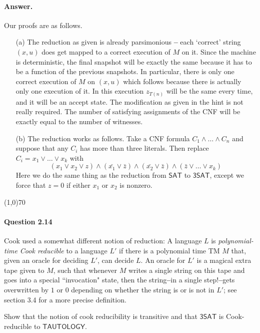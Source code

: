 \paragraph{Answer.} Our proofs are as follows.

\begin{enumerate}
	\item[(a)] The reduction as given is already parsimonious \textbf{--} each `correct' string $(x,u)$ does get mapped to a correct execution of $M$ on it. Since the machine is deterministic, the final snapshot will be exactly the same because it has to be a function of the previous snapshots. In particular, there is only one correct execution of $M$ on $(x,u)$ which follows because there is actually only one execution of it. In this execution $z_{T(n)}$ will be the same every time, and it will be an accept state. The modification as given in the hint is not really required. The number of satisfying assignments of the CNF will be exactly equal to the number of witnesses.
	\item[(b)] The reduction works as follows. Take a CNF formula $C_1\wedge \dots\wedge C_n$ and suppose that any $C_i$ has more than three literals. Then replace $C_i=x_1\vee\dots\vee x_k$ with
	$$(x_1\vee x_2\vee z)\wedge(\bar{x_1}\vee\bar{z})\wedge(\bar{x_2}\vee\bar{z})\wedge(\bar{z}\vee\dots\vee x_k)$$
	Here we do the same thing as the reduction from $\mathsf{SAT}$ to $\mathsf{3SAT}$, except we force that $z=0$ if either $x_1$ or $x_2$ is nonzero.
\end{enumerate}

\begin{center}
\line(1,0){70}
\end{center}

\paragraph{Question 2.14} Cook used a somewhat different notion of reduction: A language $L$ is \textit{polynomial-time Cook reducible} to a language $L'$ if there is a polynomial time TM $M$ that, given an oracle for deciding $L'$, can decide $L$. An oracle for $L'$ is a magical extra tape given to $M$, such that whenever $M$ writes a single string on this tape and goes into a special ``invocation" state, then the string\textbf{--}in a single step!\textbf{--}gets overwritten by $1$ or $0$ depending on whether the string is or is not in $L'$; see section 3.4 for a more precise definition.

Show that the notion of cook reducibility is transitive and that $\mathsf{3SAT}$ is Cook-reducible to $\mathsf{TAUTOLOGY}$.

